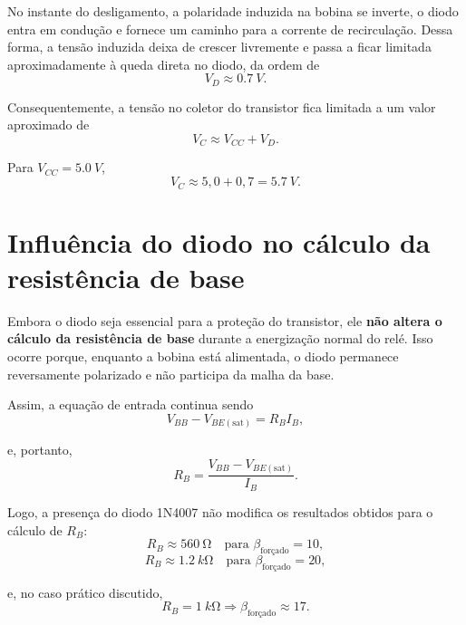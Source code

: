 \documentclass[12pt,a4paper]{article}
\newcommand{\Vbb}{V_{BB}}
\newcommand{\Vbesat}{V_{BE(\mathrm{sat})}}
\newcommand{\Ib}{I_B}
\newcommand{\Rb}{R_B}
\newcommand{\betaf}{\beta_{\text{forçado}}}
\begin{document}
No instante do desligamento, a polaridade induzida na bobina se inverte, o diodo entra em condução e fornece um caminho para a corrente de recirculação. Dessa forma, a tensão induzida deixa de crescer livremente e passa a ficar limitada aproximadamente à queda direta no diodo, da ordem de
\begin{equation}
V_D \approx \SI{0,7}{V}.
\end{equation}

Consequentemente, a tensão no coletor do transistor fica limitada a um valor aproximado de
\begin{equation}
V_C \approx V_{CC} + V_D.
\end{equation}

Para $V_{CC} = \SI{5,0}{V}$,
\begin{equation}
V_C \approx 5,0 + 0,7 = \SI{5,7}{V}.
\end{equation}

\section{Influência do diodo no cálculo da resistência de base}

Embora o diodo seja essencial para a proteção do transistor, ele \textbf{não altera o cálculo da resistência de base} durante a energização normal do relé. Isso ocorre porque, enquanto a bobina está alimentada, o diodo permanece reversamente polarizado e não participa da malha da base.

Assim, a equação de entrada continua sendo
\begin{equation}
\Vbb - \Vbesat = \Rb\Ib,
\end{equation}

e, portanto,
\begin{equation}
\Rb = \frac{\Vbb - \Vbesat}{\Ib}.
\end{equation}

Logo, a presença do diodo 1N4007 não modifica os resultados obtidos para o cálculo de $\Rb$:
\begin{equation}
\Rb \approx \SI{560}{\ohm} \quad \text{para } \betaf = 10,
\end{equation}
\begin{equation}
\Rb \approx \SI{1,2}{k\ohm} \quad \text{para } \betaf = 20,
\end{equation}

e, no caso prático discutido,
\begin{equation}
\Rb = \SI{1}{k\ohm} \Rightarrow \betaf \approx 17.
\end{equation}
\end{document}
